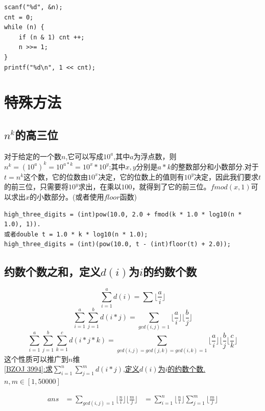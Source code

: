 \begin{lstlisting}
scanf("%d", &n);
cnt = 0;
while (n) {
	if (n & 1) cnt ++;
	n >>= 1;
}
printf("%d\n", 1 << cnt);
\end{lstlisting}

\clearpage
\section{特殊方法}

\subsection{$n^k$的高三位}

对于给定的一个数$n$,它可以写成$10^a$,其中$a$为浮点数，则$n^k=(10^a)^k=10^{a*k}=10^x*10^y$;其中$x,y$分别是$a*k$的整数部分和小数部分.对于$t=n^k$这个数，它的位数由$10^x$决定，它的位数上的值则有$10^y$决定，因此我们要求$t$的前三位，只需要将$10^y$求出，在乘以$100$，就得到了它的前三位。$fmod(x,1)$可以求出$x$的小数部分。(或者使用$floor$函数)

\begin{lstlisting}
high_three_digits = (int)pow(10.0, 2.0 + fmod(k * 1.0 * log10(n * 1.0), 1)).
或者double t = 1.0 * k * log10(n * 1.0);
high_three_digits = (int)(pow(10.0, t - (int)floor(t) + 2.0));
\end{lstlisting}

\subsection{约数个数之和，定义$d(i)$为$i$的约数个数}

$$\sum_{i=1}^{a}d(i)=\sum_{}\lfloor {\frac{a}{i}}\rfloor$$
$$\sum_{i=1}^{a}\sum_{j=1}^{b}d(i*j)=\sum_{gcd(i,j)=1}\lfloor{\frac{a}{i}}\rfloor \lfloor{\frac{b}{j}}\rfloor$$
$$\sum_{i=1}^{a}\sum_{j=1}^{b}\sum_{k=1}^{c}d(i*j*k)=\sum_{gcd(i,j)=gcd(j,k)=gcd(i,k)=1}\lfloor{\frac{a}{i}}\rfloor \lfloor{\frac{b}{j}}\lfloor {\frac{c}{k}}\rfloor$$
这个性质可以推广到$n$维 \\

\underline {[BZOJ 3994]:求$\sum_{i=1}^{n}\sum_{j=1}^{m}d(i*j)$,定义$d(i)$为$i$的约数个数.$n,m\in [1, 50000]$}

$$\begin{aligned}
ans &=\sum_{gcd(i,j)=1}\lfloor{\frac{n}{i}}\rfloor \lfloor{\frac{m}{j}}\rfloor
&= \sum_{i=1}^{n}\lfloor{\frac{n}{i}}\rfloor\sum_{j=1}^{m} \lfloor{\frac{m}{j}}\rfloor
\end{aligned}$$

